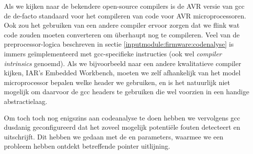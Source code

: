 Als we kijken naar de bekendere open-source compilers is de AVR versie van \ac{gcc} de de-facto standaard voor het compileren van code voor AVR microprocessoren. Ook zou het gebruiken van een andere compiler ervoor zorgen dat we flink wat code zouden moeten converteren om überhaupt nog te compileren. Veel van de preprocessor-logica beschreven in sectie \ref{inputmodule:firmware:codenalyse} is immers geïmplementeerd met \ac{gcc}-specifieke instructies (ook wel \emph{compiler intrinsics} genoemd). Als we bijvoorbeeld naar een andere kwalitatieve compiler kijken, IAR's Embedded Workbench, moeten we zelf afhankelijk van het model microprocessor bepalen welke header we gebruiken, en is het natuurlijk niet mogelijk om daarvoor de \ac{gcc} headers te gebruiken die wel voorzien in een handige abstractielaag.

Om toch toch nog enigszins aan codeanalyse te doen hebben we vervolgens \ac{gcc} dusdanig geconfigureerd dat het zoveel mogelijk potentiële fouten detecteert en uitschrijft. Dit hebben we gedaan met de  en  parameters, waarmee we een probleem hebben ontdekt betreffende pointer uitlijning.
 